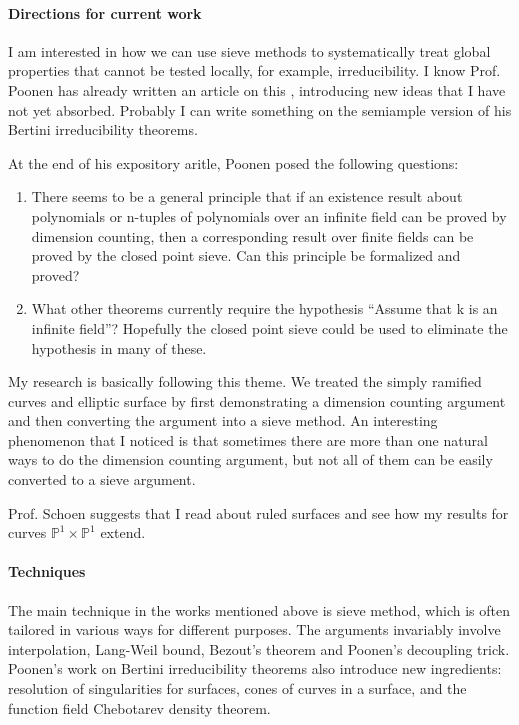 \documentclass[12pt]{article}
\theoremstyle{plain}
\theoremstyle{definition}
\newcommand{\IP}{\mathbb{P}}
\newcommand{\<}{\langle}
\renewcommand{\>}{\rangle}
\begin{document}
\paragraph{Directions for current work} I am interested in how we can use sieve methods to systematically treat global properties that cannot be tested locally, for example, irreducibility. I know Prof. Poonen has already written an article on this \cite{Pirred}, introducing new ideas that I have not yet absorbed. Probably I can write something on the semiample version of his Bertini irreducibility theorems.

At the end of his expository aritle, Poonen posed the following questions:
\begin{enumerate}
\item There seems to be a general principle that if an existence result about polynomials
or n-tuples of polynomials over an infinite field can be proved by dimension counting,
then a corresponding result over finite fields can be proved by the closed point sieve.
Can this principle be formalized and proved?

\item What other theorems currently require the hypothesis “Assume that k is an infinite
field”? Hopefully the closed point sieve could be used to eliminate the hypothesis in
many of these.
\end{enumerate}

My research is basically following this theme. We treated the simply ramified curves and elliptic surface by first demonstrating a dimension counting argument and then converting the argument into a sieve method. An interesting phenomenon that I noticed is that sometimes there are more than one natural ways to do the dimension counting argument, but not all of them can be easily converted to a sieve argument. 

Prof. Schoen suggests that I read about ruled surfaces and see how my results for curves $\IP^1 \times \IP^1$ extend. 

\paragraph{Techniques} The main technique in the works mentioned above is sieve method, which is often tailored in various ways for different purposes. The arguments invariably involve interpolation, Lang-Weil bound, Bezout's theorem and Poonen's decoupling trick. Poonen's work on Bertini irreducibility theorems also introduce new ingredients: resolution of singularities for surfaces, cones of curves in a surface, and the function field Chebotarev density theorem. 
\end{document}
